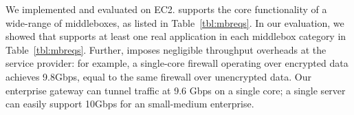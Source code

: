 We implemented and evaluated \sys on EC2. \sys supports the core functionality of a wide-range of  middleboxes, as listed in Table~\ref{tbl:mbreqs}.
In our evaluation, we showed that \sys supports at least one real application in each middlebox category in Table~\ref{tbl:mbreqs}.
Further, \sys imposes  negligible throughput overheads at the service provider: for example, a single-core firewall operating over encrypted data achieves 9.8Gbps, equal to the same firewall over unencrypted data.
Our enterprise gateway can tunnel traffic at 9.6 Gbps on a single core;  a single server can easily support 10Gbps for an small-medium enterprise.




